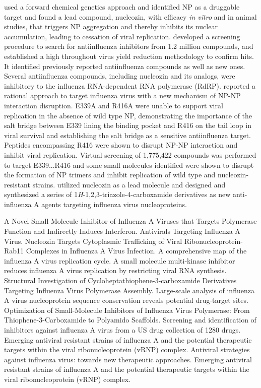 \citep{906} used a forward chemical genetics approach and identified NP as a druggable target and found a lead compound, nucleozin, with efficacy \textit{in vitro} and in animal studies, that triggers NP aggregation and thereby inhibits its nuclear accumulation, leading to cessation of viral replication. \citep{1515} developed a screening procedure to search for antiinfluenza inhibitors from 1.2 million compounds, and established a high throughout virus yield reduction methodology to confirm hits. It identified previously reported antiinfluenza compounds as well as new ones. Several antiinfluenza compounds, including nucleozin and its analogs, were inhibitory to the influenza RNA-dependent RNA polymerase (RdRP). \citep{1233} reported a rational approach to target influenza virus with a new mechanism of NP-NP interaction disruption. E339A and R416A were unable to support viral replication in the absence of wild type NP, demonstrating the importance of the salt bridge between E339 lining the binding pocket and R416 on the tail loop in viral survival and establishing the salt bridge as a sensitive antiinfluenza target. Peptides encompassing R416 were shown to disrupt NP-NP interaction and inhibit viral replication. Virtual screening of 1,775,422 compounds was performed to target E339...R416 and some small molecules identified were shown to disrupt the formation of NP trimers and inhibit replication of wild type and nucleozin-resistant strains. \citep{1516} utilized nucleozin as a lead molecule and designed and synthesized a series of 1\textit{H}-1,2,3-triazole-4-carboxamide derivatives as new anti-influenza A agents targeting influenza virus nucleoproteins.

\citep{1520} A Novel Small Molecule Inhibitor of Influenza A Viruses that Targets Polymerase Function and Indirectly Induces Interferon.%
\citep{1519} Antivirals Targeting Influenza A Virus.%
\citep{1521} Nucleozin Targets Cytoplasmic Trafficking of Viral Ribonucleoprotein-Rab11 Complexes in Influenza A Virus Infection.%
\citep{1522} A comprehensive map of the influenza A virus replication cycle.%
\citep{1524} A small molecule multi-kinase inhibitor reduces influenza A virus replication by restricting viral RNA synthesis.%
\citep{1550} Structural Investigation of Cycloheptathiophene-3-carboxamide Derivatives Targeting Influenza Virus Polymerase Assembly.%
\citep{1513} Large-scale analysis of influenza A virus nucleoprotein sequence conservation reveals potential drug-target sites.%
\citep{1527} Optimization of Small-Molecule Inhibitors of Influenza Virus Polymerase: From Thiophene-3-Carboxamide to Polyamido Scaffolds.%
\citep{1526} Screening and identification of inhibitors against influenza A virus from a US drug collection of 1280 drugs.%
\citep{1523} Emerging antiviral resistant strains of influenza A and the potential therapeutic targets within the viral ribonucleoprotein (vRNP) complex.%
\citep{1525} Antiviral strategies against influenza virus: towards new therapeutic approaches.%
\citep{1549} Emerging antiviral resistant strains of influenza A and the potential therapeutic targets within the viral ribonucleoprotein (vRNP) complex.

